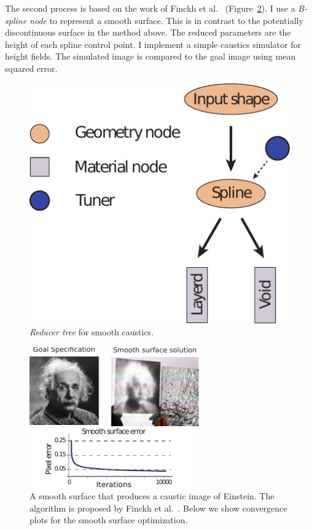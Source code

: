 The second process is based on the work of Finckh et al.~ (Figure~\ref{fig:spline}).
I use a \emph{B-spline node} to represent a smooth surface.
This is in contrast to the potentially discontinuous surface in the method above.
The reduced parameters are the height of each spline control point.
I implement a simple caustics simulator for height fields.
The simulated image is compared to the goal image using mean squared error.

\begin{figure}
\centering
\includegraphics[scale=0.7]{figure/treeSpline.pdf}
\caption {\emph{Reducer tree} for smooth caustics.
}
\label{fig:treeSpline}
\end{figure}

\begin{figure}
\centering
\includegraphics[width=0.65\textwidth]{figure/spline.pdf}
\caption {A smooth surface that produces a caustic image of Einstein.
The algorithm is proposed by Finckh et al.~.
Below we show convergence plots for the smooth surface optimization.
}
\label{fig:spline}
\end{figure}

